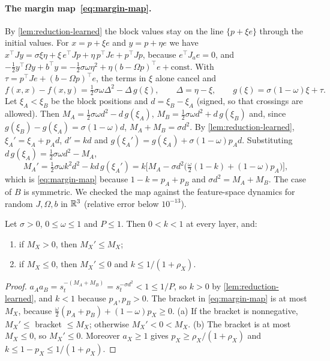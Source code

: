 \paragraph{The margin map~\eqref{eq:margin-map}.} By \cref{lem:reduction-learned} the block values stay on the line $\{p+\xi e\}$ through the initial
values. For $x=p+\xi e$ and $y=p+\eta e$ we have $x^\top Jy=\sigma\xi\eta+\xi\,e^\top Jp+\eta\,p^\top Je+p^\top Jp$, because $e^\top J_ae=0$, and
$-\frac12y^\top\Omega y+b^\top y=-\frac12\sigma\omega\eta^2+\eta(b-\Omega p)^\top e+\text{const}$. With $\tau=p^\top Je+(b-\Omega p)^\top e$, the terms in
$\xi$ alone cancel and
\[
f(x,x)-f(x,y)=\tfrac12\sigma\omega\Delta^2-\Delta\,g(\xi),\qquad \Delta=\eta-\xi,\qquad g(\xi)=\sigma(1-\omega)\xi+\tau .
\]
Let $\xi_A<\xi_B$ be the block positions and $d=\xi_B-\xi_A$ (signed, so that crossings are allowed). Then $M_A=\frac12\sigma\omega d^2-d\,g(\xi_A)$,
$M_B=\frac12\sigma\omega d^2+d\,g(\xi_B)$ and, since $g(\xi_B)-g(\xi_A)=\sigma(1-\omega)d$, $M_A+M_B=\sigma d^2$. By \cref{lem:reduction-learned},
$\xi_A'=\xi_A+p_Ad$, $d'=kd$ and $g(\xi_A')=g(\xi_A)+\sigma(1-\omega)p_Ad$. Substituting $d\,g(\xi_A)=\frac12\sigma\omega d^2-M_A$,
\[
M_A'=\tfrac12\sigma\omega k^2d^2-kd\,g(\xi_A')=k\big[M_A-\sigma d^2\big(\tfrac\omega2(1-k)+(1-\omega)p_A\big)\big],
\]
which is \eqref{eq:margin-map} because $1-k=p_A+p_B$ and $\sigma d^2=M_A+M_B$. The case of $B$ is symmetric. We checked the map against the
feature-space dynamics for random $J,\Omega,b$ in $\mathbb{R}^3$ (relative error below $10^{-13}$).

\begin{lemma}\label{lem:map}
Let $\sigma>0$, $0\le\omega\le1$ and $P\le1$. Then $0<k<1$ at every layer, and:
\begin{enumerate}[label=(\alph*),leftmargin=2em,itemsep=1pt]
\item if $M_X>0$, then $M_X'\le M_X$;
\item if $M_X\le0$, then $M_X'\le0$ and $k\le1/(1+\rho_X)$.
\end{enumerate}
\end{lemma}

\begin{proof}
$a_Aa_B=s_t^{-(M_A+M_B)}=s_t^{-\sigma d^2}<1\le1/P$, so $k>0$ by \cref{lem:reduction-learned}, and $k<1$ because $p_A,p_B>0$. The bracket in
\eqref{eq:margin-map} is at most $M_X$, because $\frac\omega2(p_A+p_B)+(1-\omega)p_X\ge0$. (a) If the bracket is nonnegative, $M_X'\le$ bracket
$\le M_X$; otherwise $M_X'<0<M_X$. (b) The bracket is at most $M_X\le0$, so $M_X'\le0$. Moreover $a_X\ge1$ gives $p_X\ge\rho_X/(1+\rho_X)$ and
$k\le1-p_X\le1/(1+\rho_X)$.
\end{proof}

